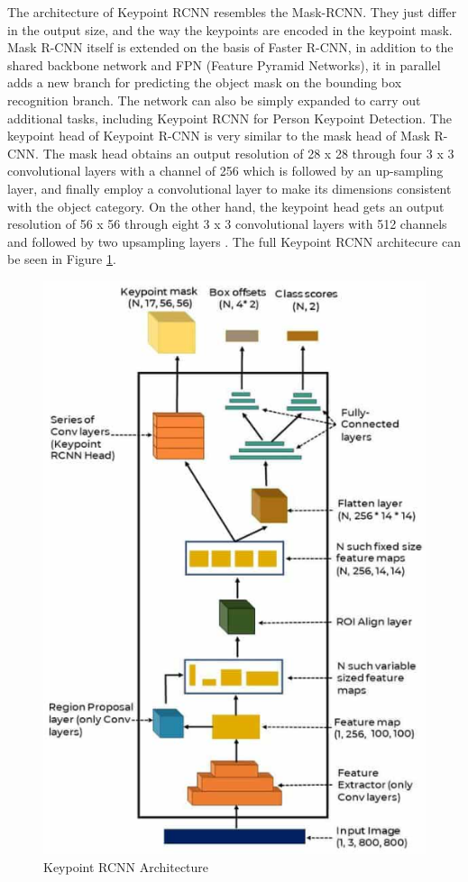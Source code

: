 The architecture of Keypoint RCNN resembles the Mask-RCNN. They just differ in the output size, and the way the keypoints are encoded in the keypoint mask. Mask R-CNN itself is extended on the basis of Faster R-CNN,
in addition to the shared backbone network and FPN (Feature Pyramid Networks), it in parallel adds a new branch for predicting the object mask on the bounding box recognition branch.
The network can also be simply expanded to carry out additional tasks, including Keypoint RCNN for Person Keypoint Detection. The keypoint head of Keypoint R-CNN is very similar to the mask head of Mask R-CNN. The mask head obtains an output resolution of
28 x 28 through four 3 x 3 convolutional layers with a channel of 256 which is followed by an up-sampling layer, and finally
employ a convolutional layer to make its dimensions consistent with the object category. On the other hand, the keypoint head gets an output resolution of 56 x 56 through eight 3 x 3 convolutional
layers with 512 channels and followed by two upsampling layers \parencite{zhang2021}.
The full Keypoint RCNN architecure can be seen in Figure \ref{fig:keypoint-rcnn-architecture}.

\begin{figure}[ht]
  \centering
  \includegraphics[scale=0.9]{gambar/keypoint-rcnn-arch.png}
  \caption{Keypoint RCNN Architecture}
  \label{fig:keypoint-rcnn-architecture}
\end{figure}